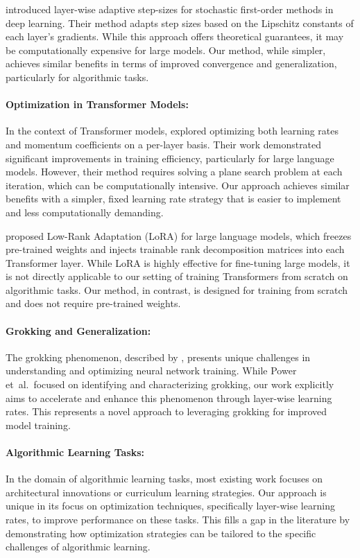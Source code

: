 \documentclass{article} %
\begin{document}
\citet{Bahamou2023LayerwiseAS} introduced layer-wise adaptive step-sizes for stochastic first-order methods in deep learning. Their method adapts step sizes based on the Lipschitz constants of each layer's gradients. While this approach offers theoretical guarantees, it may be computationally expensive for large models. Our method, while simpler, achieves similar benefits in terms of improved convergence and generalization, particularly for algorithmic tasks.

\paragraph{Optimization in Transformer Models:}
In the context of Transformer models, \citet{Shea2024WhyLS} explored optimizing both learning rates and momentum coefficients on a per-layer basis. Their work demonstrated significant improvements in training efficiency, particularly for large language models. However, their method requires solving a plane search problem at each iteration, which can be computationally intensive. Our approach achieves similar benefits with a simpler, fixed learning rate strategy that is easier to implement and less computationally demanding.

\citet{Hu2021LoRALA} proposed Low-Rank Adaptation (LoRA) for large language models, which freezes pre-trained weights and injects trainable rank decomposition matrices into each Transformer layer. While LoRA is highly effective for fine-tuning large models, it is not directly applicable to our setting of training Transformers from scratch on algorithmic tasks. Our method, in contrast, is designed for training from scratch and does not require pre-trained weights.

\paragraph{Grokking and Generalization:}
The grokking phenomenon, described by \citet{power2022grokking}, presents unique challenges in understanding and optimizing neural network training. While Power et~al.\ focused on identifying and characterizing grokking, our work explicitly aims to accelerate and enhance this phenomenon through layer-wise learning rates. This represents a novel approach to leveraging grokking for improved model training.

\paragraph{Algorithmic Learning Tasks:}
In the domain of algorithmic learning tasks, most existing work focuses on architectural innovations or curriculum learning strategies. Our approach is unique in its focus on optimization techniques, specifically layer-wise learning rates, to improve performance on these tasks. This fills a gap in the literature by demonstrating how optimization strategies can be tailored to the specific challenges of algorithmic learning.
\end{document}
